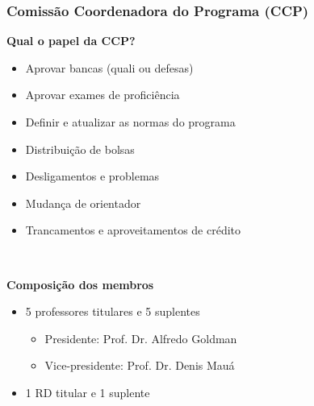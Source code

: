 \documentclass{beamer}
\begin{document}
\begin{frame}
  \frametitle{Comissão Coordenadora do Programa (CCP)}

  \textbf{Qual o papel da CCP?}
  \begin{itemize}
    \item Aprovar bancas (quali ou defesas)
    \item Aprovar exames de proficiência
    \item Definir e atualizar as normas do programa
    \item Distribuição de bolsas
    \item Desligamentos e problemas
    \item Mudança de orientador
    \item Trancamentos e aproveitamentos de crédito
  \end{itemize}~\\\pause

  \textbf{Composição dos membros}
  \begin{itemize}
    \item 5 professores titulares e 5 suplentes
    \begin{itemize}
      \item Presidente: Prof. Dr. Alfredo Goldman
      \item Vice-presidente: Prof. Dr. Denis Mauá
    \end{itemize}
    \item 1 RD titular e 1 suplente
  \end{itemize}
\end{frame}
\end{document}
